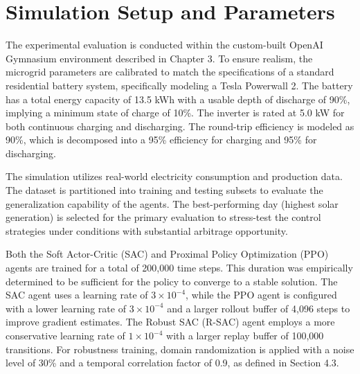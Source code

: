 
\section{Simulation Setup and Parameters}

The experimental evaluation is conducted within the custom-built OpenAI Gymnasium environment described in Chapter 3. To ensure realism, the microgrid parameters are calibrated to match the specifications of a standard residential battery system, specifically modeling a Tesla Powerwall 2. The battery has a total energy capacity of 13.5 kWh with a usable depth of discharge of 90\%, implying a minimum state of charge of 10\%. The inverter is rated at 5.0 kW for both continuous charging and discharging. The round-trip efficiency is modeled as 90\%, which is decomposed into a 95\% efficiency for charging and 95\% for discharging.

The simulation utilizes real-world electricity consumption and production data. The dataset is partitioned into training and testing subsets to evaluate the generalization capability of the agents. The best-performing day (highest solar generation) is selected for the primary evaluation to stress-test the control strategies under conditions with substantial arbitrage opportunity.

Both the Soft Actor-Critic (SAC) and Proximal Policy Optimization (PPO) agents are trained for a total of 200,000 time steps. This duration was empirically determined to be sufficient for the policy to converge to a stable solution. The SAC agent uses a learning rate of $3 \times 10^{-4}$, while the PPO agent is configured with a lower learning rate of $3 \times 10^{-4}$ and a larger rollout buffer of 4,096 steps to improve gradient estimates. The Robust SAC (R-SAC) agent employs a more conservative learning rate of $1 \times 10^{-4}$ with a larger replay buffer of 100,000 transitions. For robustness training, domain randomization is applied with a noise level of 30\% and a temporal correlation factor of 0.9, as defined in Section 4.3.

